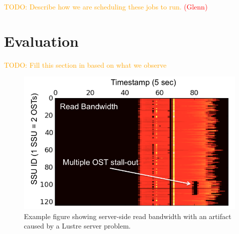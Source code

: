 \documentclass[conference,10pt,compsocconf]{IEEEtran}
\newcommand{\assign}[1]{\textcolor{red}{(#1)}}
\newcommand{\todo}[1]{\textcolor{Orange}{TODO: #1}}
\begin{document}
\todo{Describe how we are scheduling these jobs to run.} \assign{Glenn}

\section{Evaluation}

\todo{Fill this section in based on what we observe}

\begin{figure}[t]
\centering
\includegraphics[width=0.8\columnwidth]{figs/example.png}
\caption{Example figure showing server-side read bandwidth with an artifact
caused by a Lustre server problem.}
\label{fig:example}
\vspace{-.1in}
\end{figure}
\end{document}
